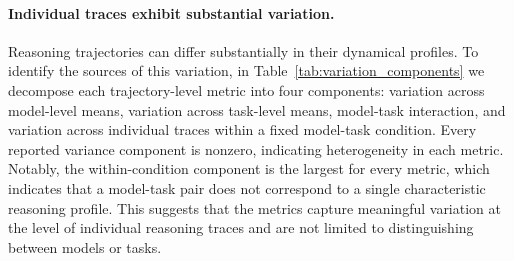 \documentclass{article}
\begin{document}
\paragraph{Individual traces exhibit substantial variation.} 
Reasoning trajectories can differ substantially in their dynamical profiles. To identify the sources of this variation, in Table~\ref{tab:variation_components} we decompose each trajectory-level metric into four components: variation across model-level means, variation across task-level means, model-task interaction, and variation across individual traces within a fixed model-task condition. Every reported variance component is nonzero, indicating heterogeneity in each metric. Notably, the within-condition component is the largest for every metric, which indicates that a model-task pair does not correspond to a single characteristic reasoning profile. This suggests that the metrics capture meaningful variation at the level of individual reasoning traces and are not limited to distinguishing between models or tasks.

\begin{table}[t]
\centering
\caption{Magnitude and sources of variation in trajectory-level reasoning metrics. Entries report root variance components in the natural units of each metric. The total variation is obtained by summing the squared components and taking the square root. Model-task pairs are weighted equally.}
\label{tab:variation_components}
\small
{}
\end{table}
\end{document}
